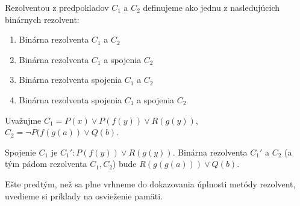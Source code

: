 \begin{definicia} 
    Rezolventou z predpokladov $C_1$ a $C_2$ definujeme ako jednu z
    nasledujúcich binárnych rezolvent:
    \begin{enumerate}
        \item Binárna rezolventa $C_1$ a $C_2$
        \item Binárna rezolventa $C_1$ a spojenia $C_2$
        \item Binárna rezolventa spojenia $C_1$ a $C_2$
        \item Binárna rezolventa spojenia $C_1$ a spojenia $C_2$
    \end{enumerate}
\end{definicia}

\begin{priklad}
    Uvažujme $C_1 = P(x) \lor P(f(y))\lor R(g(y))$,
             $C_2 = \neg P(f(g(a)) \lor Q(b)$.

    Spojenie $C_1$ je $C_1': P(f(y)) \lor R(g(y))$.
    Binárna rezolventa $C_1'$ a $C_2$ (a tým pádom rezolventa
    $C_1,C_2$) bude $R(g(g(a))) \lor Q(b)$.
\end{priklad}

Ešte predtým, než sa plne vrhneme do dokazovania úplnosti metódy
rezolvent, uvedieme si príklady na osvieženie pamäti.


